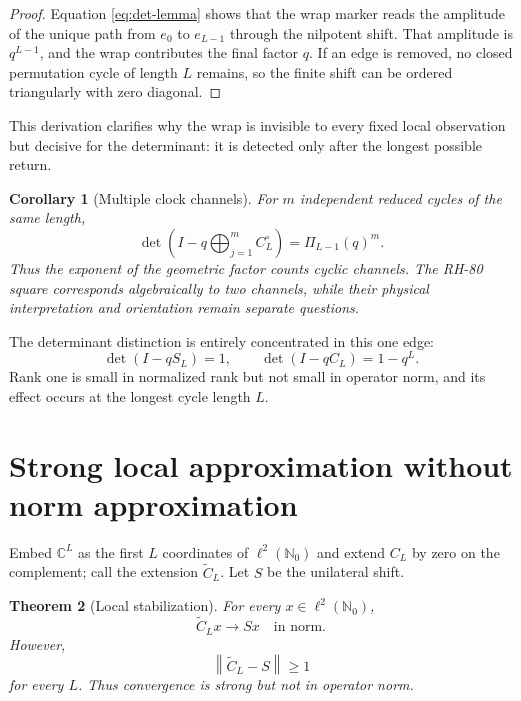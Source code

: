 \documentclass[12pt]{article}
\newtheorem{theorem}{Theorem}[section]
\newtheorem{corollary}[theorem]{Corollary}
\theoremstyle{remark}
\newcommand{\norm}[1]{\left\lVert#1\right\rVert}
\begin{document}
\begin{proof}
Equation \eqref{eq:det-lemma} shows that the wrap marker reads the amplitude
of the unique path from $e_0$ to $e_{L-1}$ through the nilpotent shift.  That
amplitude is $q^{L-1}$, and the wrap contributes the final factor $q$.  If an
edge is removed, no closed permutation cycle of length $L$ remains, so the
finite shift can be ordered triangularly with zero diagonal.
\end{proof}

This derivation clarifies why the wrap is invisible to every fixed local
observation but decisive for the determinant: it is detected only after the
longest possible return.

\begin{corollary}[Multiple clock channels]
For $m$ independent reduced cycles of the same length,
\[
 \det\left(I-q\bigoplus_{j=1}^m C_L^\circ\right)
 =\Pi_{L-1}(q)^m.
\]
Thus the exponent of the geometric factor counts cyclic channels.  The RH-80
square corresponds algebraically to two channels, while their physical
interpretation and orientation remain separate questions.
\end{corollary}

The determinant distinction is entirely concentrated in this one edge:
\[
 \det(I-qS_L)=1,
 \qquad
 \det(I-qC_L)=1-q^L.
\]
Rank one is small in normalized rank but not small in operator norm, and its
effect occurs at the longest cycle length $L$.

\section{Strong local approximation without norm approximation}

Embed $\mathbb C^L$ as the first $L$ coordinates of $\ell^2(\mathbb N_0)$
and extend $C_L$ by zero on the complement; call the extension
$\widetilde C_L$.  Let $S$ be the unilateral shift.

\begin{theorem}[Local stabilization]\label{thm:strong}
For every $x\in\ell^2(\mathbb N_0)$,
\begin{equation}\label{eq:strong}
 \widetilde C_Lx\longrightarrow Sx
 \quad\text{in norm}.
\end{equation}
However,
\begin{equation}\label{eq:no-norm}
 \norm{\widetilde C_L-S}\ge1
\end{equation}
for every $L$.  Thus convergence is strong but not in operator norm.
\end{theorem}
\end{document}
